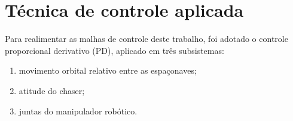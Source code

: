 \section{Técnica de controle aplicada}
\label{sec:tecnica_pd}

Para realimentar as malhas de controle deste trabalho, foi adotado o controle proporcional derivativo (PD), aplicado em três subsistemas:
\begin{enumerate}[label=\roman*.]
    \item movimento orbital relativo entre as espaçonaves;
    \item atitude do chaser;
    \item juntas do manipulador robótico.
\end{enumerate}












